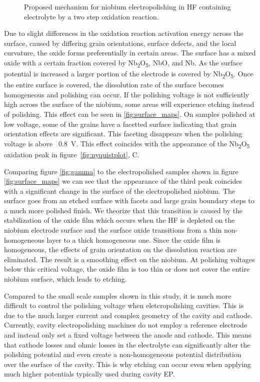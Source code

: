 \begin{figure}[t]
  \centering
  
  
  \caption{Proposed mechanism for niobium electropolishing in HF containing electrolyte by a two step oxidation reaction.}
  \label{fig:diagram}
\end{figure}



Due to slight differences in the oxidation reaction activation energy across the surface, caused by differing grain orientations, surface defects, and the local curvature, the oxide forms preferentially in certain areas. The surface has a mixed oxide with a certain fraction covered by Nb\textsubscript{2}O\textsubscript{5}, NbO, and Nb. As the surface potential is increased a larger portion of the electrode is covered by Nb\textsubscript{2}O\textsubscript{5}. Once the entire surface is covered, the dissolution rate of the surface becomes homogeneous and polishing can occur. If the polishing voltage is not sufficiently high across the surface of the niobium, some areas will experience etching instead of polishing. This effect can be seen in \ref{fig:surface_maps}. On samples polished at low voltage, some of the grains have a facetted surface indicating that grain orientation effects are significant. This faceting disappears when the polishing voltage is above ~\qty{0.8}{\volt}. This effect coincides with the appearance of the Nb\textsubscript{2}O\textsubscript{5} oxidation peak in figure~\ref{fig:nyquistplot}, C.

Comparing figure \ref{fig:gamma} to the electropolished samples shown in figure \ref{fig:surface_maps} we can see that the appearance of the third peak coincides with a significant change in the surface of the electropolished niobium. The surface goes from an etched surface with facets and large grain boundary steps to a much more polished finish. We theorize that this transition is caused by the stabilization of the oxide film which occurs when the HF is depleted on the niobium electrode surface and the surface oxide transitions from a thin non-homogeneous layer to a thick homogeneous one. Since the oxide film is homogeneous, the effects of grain orientation on the dissolution reaction are eliminated. The result is a smoothing effect on the niobium. At polishing voltages below this critical voltage, the oxide film is too thin or does not cover the entire niobium surface, which leads to etching.

Compared to the small scale samples shown in this study, it is much more difficult to control the polishing voltage when eletcropolishing cavities. This is due to the much larger current and complex geometry of the cavity and cathode. Currently, cavity electropolishing machines do not employ a reference electrode and instead only set a fixed voltage between the anode and cathode. This means that cathode losses and ohmic losses in the electrolyte can significantly alter the polishing potential and even create a non-homogeneous potential distribution over the surface of the cavity. This is why etching can occur even when applying much higher potentials typically used during cavity EP.


